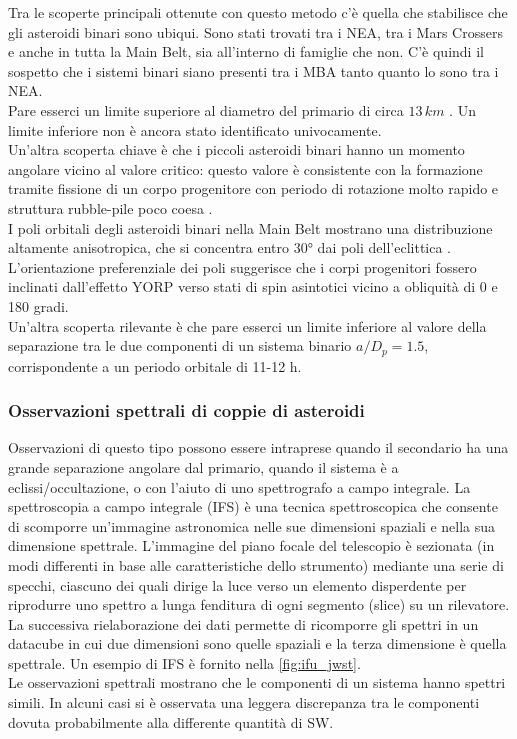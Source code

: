 \documentclass[a4paper,11pt,openright]{book}
\begin{document}
Tra le scoperte principali ottenute con questo metodo c'è quella che stabilisce che gli asteroidi binari sono ubiqui. Sono stati trovati tra i NEA, tra i Mars Crossers e anche in tutta la Main Belt, sia all'interno di famiglie che non. C'è quindi il sospetto che i sistemi binari siano presenti tra i MBA tanto quanto lo sono tra i NEA.\\ Pare esserci un limite superiore al diametro del primario di circa $13\,km$ \citep{carry_small_2015}. Un limite inferiore non è ancora stato identificato univocamente.\\
Un'altra scoperta chiave è che i piccoli asteroidi binari hanno un momento angolare vicino al valore critico: questo valore è consistente con la formazione tramite fissione di un corpo progenitore con periodo di rotazione molto rapido e struttura rubble-pile poco coesa \citep{pravec_binary_2007}.\\
I poli orbitali degli asteroidi binari nella Main Belt mostrano una distribuzione altamente anisotropica, che si concentra entro 30° dai poli dell'eclittica \citep{pravec_binary_2012}. L'orientazione preferenziale dei poli suggerisce che i corpi progenitori fossero inclinati dall'effetto YORP verso stati di spin asintotici vicino a obliquità di 0 e 180 gradi.\\
Un'altra scoperta rilevante è che pare esserci un limite inferiore al valore della separazione tra le due componenti di un sistema binario $a/D_p=1.5$, corrispondente a un periodo orbitale di 11-12 h.\\

\subsubsection{Osservazioni spettrali di coppie di asteroidi}
Osservazioni di questo tipo possono essere intraprese quando il secondario ha una grande separazione angolare dal primario, quando il sistema è a eclissi/occultazione, o con l'aiuto di uno spettrografo a campo integrale. La spettroscopia a campo integrale (IFS) è una tecnica spettroscopica che consente di scomporre un'immagine astronomica nelle sue dimensioni spaziali e nella sua dimensione spettrale. L'immagine del piano focale del telescopio è sezionata (in modi differenti in base alle caratteristiche dello strumento) mediante una serie di specchi, ciascuno dei quali dirige la luce verso un elemento disperdente per riprodurre uno spettro a lunga fenditura di ogni segmento (slice) su un rilevatore. La successiva rielaborazione dei dati permette di ricomporre gli spettri in un datacube in cui due dimensioni sono quelle spaziali e la terza dimensione è quella spettrale. Un esempio di IFS è fornito nella \cref{fig:ifu_jwst}.\\
Le osservazioni spettrali mostrano che le componenti di un sistema hanno spettri simili. In alcuni casi si è osservata una leggera discrepanza tra le componenti dovuta probabilmente alla differente quantità di SW.
\end{document}

